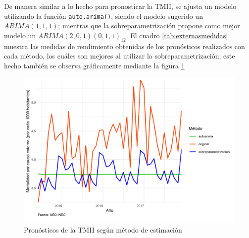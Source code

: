 \documentclass[
]{article}
\begin{document}
De manera similar a lo hecho para pronosticar la TMII, se ajusta un
modelo utilizando la función \texttt{auto.arima()}, siendo el modelo
sugerido un \(ARIMA(1,1,1)\); mientras que la sobreparametrización
propone como mejor modelo un \(ARIMA(2,0,1)(0,1,1)_{12}\). El cuadro
\ref{tab:externasmedidas} muestra las medidas de rendimiento obtenidas
de los pronósticos realizados con cada método, los cuáles son mejores al
utilizar la sobreparametrización; este hecho también se observa
gráficamente mediante la figura \ref{fig:externasplotpronostico}

\begin{table}[!h]

\caption{\label{tab:unnamed-chunk-18}\label{tab:externasmedidas}Medidas de rendimiento según método de estimación para la Mortalidad por causa externa}
\centering
{}
\end{table}

\begin{figure}[!h]
\includegraphics[width=1\linewidth,height=1\textheight]{Tesis_files/figure-latex/externasplotpronostico-1} \caption{Pronósticos de la TMII según método de estimación}\label{fig:externasplotpronostico}
\end{figure}
\end{document}
